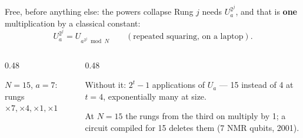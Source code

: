 \documentclass[aspectratio=169,11pt]{beamer}
\newcommand{\code}[2][]{}
\newcommand{\bundle}[3]{\draw[thick,color=body] (#1-0.07,#2-0.13) -- (#1+0.07,#2+0.13);
  \node[font=\tiny,color=subtle,above right=-1pt] at (#1,#2) {#3};}
\begin{document}
\setcounter{framenumber}{40}
\begin{frame}[fragile]{Free, before anything else: the powers collapse}
  Rung $j$ needs $U_a^{2^j}$, and that is \textbf{one} multiplication by a classical constant:
  \[ U_a^{2^j}=U_{a^{2^j}\bmod N}\qquad(\text{repeated squaring, on a laptop}). \]
  \begin{columns}[c]
    \begin{column}{0.48\textwidth}
      \centering
      \par
      {\small $N=15$, $a=7$: rungs $\times7,\times4,\times1,\times1$}
    \end{column}
    \begin{column}{0.48\textwidth}
      \begin{greyblock}
        Without it: $2^t-1$ applications of $U_a$ --- 15 instead of 4 at $t=4$, exponentially many at size.
      \end{greyblock}
      {\small At $N=15$ the rungs from the third on multiply by 1; a circuit compiled for 15 deletes them (7 NMR qubits, 2001).}
    \end{column}
  \end{columns}
  \code[basicstyle=\ttfamily\footnotesize]{ladder.py}
\end{frame}
\end{document}

